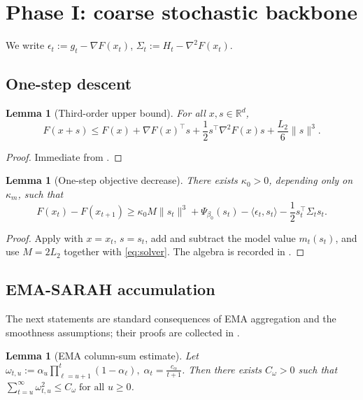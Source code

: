 \documentclass{article}
\theoremstyle{plain}
\newtheorem{lemma}[theorem]{Lemma}
\theoremstyle{definition}
\theoremstyle{remark}
\begin{document}
\section{Phase I: coarse stochastic backbone}\label{sec:phase1}

We write $
\epsilon_t:=g_t-\nabla F(x_t)$,
$\Sigma_t:=H_t-\nabla^2F(x_t)$.

\subsection{One-step descent}

\begin{lemma}[Third-order upper bound]\label{lem:taylor}
For all \(x,s\in\mathbb R^d\),
\[
F(x+s)\le F(x)+\nabla F(x)^\top s+\frac12 s^\top \nabla^2F(x)s+\frac{L_2}{6}\|s\|^3.
\]
\end{lemma}

\begin{proof}
Immediate from .
\end{proof}

\begin{lemma}[One-step objective decrease]\label{lem:onestep}
There exists \(\kappa_0>0\), depending only on \(\kappa_m\), such that
\[
F(x_t)-F(x_{t+1})
\ge
\kappa_0 M\|s_t\|^3+\Psi_{\beta_0}(s_t)
-\langle \epsilon_t,s_t\rangle
-\frac12 s_t^\top \Sigma_t s_t.
\]
\end{lemma}

\begin{proof}
Apply  with \(x=x_t\), \(s=s_t\), add and subtract the model value \(m_t(s_t)\), and use \(M=2L_2\) together with \eqref{eq:solver}. The algebra is recorded in .
\end{proof}

\subsection{EMA-SARAH accumulation}

The next statements are standard consequences of EMA aggregation and the smoothness assumptions; their proofs are collected in .

\begin{lemma}[EMA column-sum estimate]\label{lem:ema-main}
Let $
\omega_{t,u}:=\alpha_u\prod_{\ell=u+1}^t(1-\alpha_\ell),
\;
\alpha_t=\frac{c_\alpha}{t+1}$.
Then there exists \(C_\omega>0\) such that $
\sum_{t=u}^\infty \omega_{t,u}^2\le C_\omega
\; \text{for all }u\ge 0$.
\end{lemma}
\end{document}
